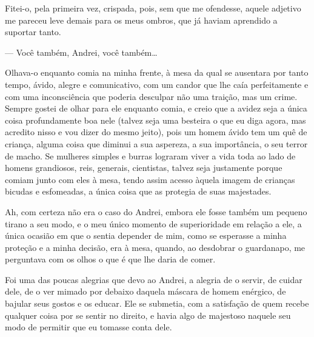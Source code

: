 
Fitei-o, pela primeira vez, crispada, pois, sem que me ofendesse, aquele
adjetivo me pareceu leve demais para os meus ombros, que já haviam
aprendido a suportar tanto.

--- Você também, Andrei, você também\ldots{}

Olhava-o enquanto comia na minha frente, à mesa da qual se ausentara por
tanto tempo, ávido, alegre e comunicativo, com um candor que lhe caía
perfeitamente e com uma inconsciência que poderia desculpar não uma
traição, mas um crime. Sempre gostei de olhar para ele enquanto comia, e
creio que a avidez seja a única coisa profundamente boa nele (talvez
seja uma besteira o que eu diga agora, mas acredito nisso e vou dizer do
mesmo jeito), pois um homem ávido tem um quê de criança, alguma coisa
que diminui a sua aspereza, a sua importância, o seu terror de macho. Se
mulheres simples e burras lograram viver a vida toda ao lado de homens
grandiosos, reis, generais, cientistas, talvez seja justamente porque
comiam junto com eles à mesa, tendo assim acesso àquela imagem de
crianças bicudas e esfomeadas, a única coisa que as protegia de suas
majestades.\label{majestades}

Ah, com certeza não era o caso do Andrei, embora ele fosse também um
pequeno tirano a seu modo, e o meu único momento de superioridade em
relação a ele, a única ocasião em que o sentia depender de mim, como se
esperasse a minha proteção e a minha decisão, era à mesa, quando, ao
desdobrar o guardanapo, me perguntava com os olhos o que é que lhe daria
de comer.


Foi uma das poucas alegrias que devo ao Andrei, a alegria de o servir,
de cuidar dele, de o ver mimado por debaixo daquela máscara de homem
enérgico, de bajular seus gostos e os educar. Ele se submetia, com a
satisfação de quem recebe qualquer coisa por se sentir no direito, e
havia algo de majestoso naquele seu modo de permitir que eu tomasse
conta dele.


